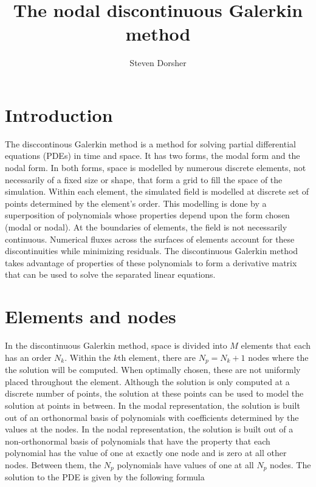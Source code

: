 \documentclass{article}
\begin{document}
\title{The nodal discontinuous Galerkin method}

\author{Steven Dorsher}

\maketitle
\doublespace


\section{Introduction}

The disccontinous Galerkin method is a method for solving partial
differential equations (PDEs) in time and space. It has two forms, the
modal form and the nodal form. In both forms, space is modelled by
numerous discrete elements, not necessarily of a fixed size or shape,
that form a grid to fill the space of the simulation. Within each
element, the simulated field is modelled at discrete set of points
determined by the element's order. This modelling is done by a
superposition of polynomials whose properties depend upon the form
chosen (modal or nodal). At the boundaries of elements, the field is
not necessarily continuous. Numerical fluxes across the surfaces of
elements account for these discontinuities while
minimizing residuals. The discontinuous Galerkin method takes
advantage of properties of these polynomials to form a derivative
matrix that can be used to solve the separated linear equations.



\section{Elements and nodes}
\label{sec:nodes}

In the discontinuous Galerkin method, space is divided into $M$
elements that each has an order $N_k$. Within the $k$th element, there
are $N_p=N_k+1$ nodes where the the solution will be computed. When
optimally chosen, these are not uniformly placed throughout the
element. Although the solution is only computed at a discrete number
of points, the solution at these points can be used to model the
solution at points in between. In the modal representation, the
solution is built out of an orthonormal basis of polynomials with
coefficients determined by the values at the nodes. In the nodal
representation, the solution is built out of a non-orthonormal basis
of polynomials that have the property that each polynomial has the
value of one at exactly one node and is zero at all other
nodes. Between them, the $N_p$ polynomials have values of one at all
$N_p$ nodes. The solution to the PDE is given by the following formula
\end{document}

